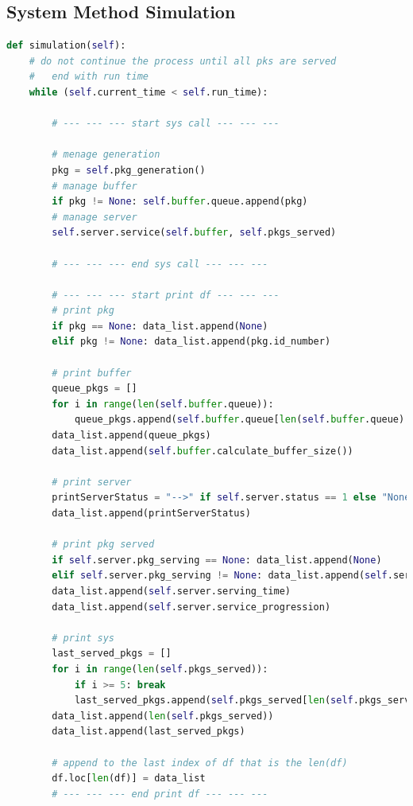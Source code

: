 \documentclass[12pt,a4paper]{article}
\begin{document}
\subsection{System Method Simulation}
\begin{lstlisting}[language=Python, caption=System Method Simulation]
def simulation(self): 
    # do not continue the process until all pks are served 
    # 	end with run time 
    while (self.current_time < self.run_time):

        # --- --- --- start sys call --- --- --- 

        # menage generation 
        pkg = self.pkg_generation()
        # manage buffer 
        if pkg != None: self.buffer.queue.append(pkg)
        # manage server
        self.server.service(self.buffer, self.pkgs_served)

        # --- --- --- end sys call --- --- ---
         
		# --- --- --- start print df --- --- ---
        # print pkg
        if pkg == None: data_list.append(None)
        elif pkg != None: data_list.append(pkg.id_number)

        # print buffer
        queue_pkgs = []
        for i in range(len(self.buffer.queue)):
            queue_pkgs.append(self.buffer.queue[len(self.buffer.queue) - i - 1].id_number)
        data_list.append(queue_pkgs)
        data_list.append(self.buffer.calculate_buffer_size())

        # print server 
        printServerStatus = "-->" if self.server.status == 1 else "None"
        data_list.append(printServerStatus)

        # print pkg served 
        if self.server.pkg_serving == None: data_list.append(None)
        elif self.server.pkg_serving != None: data_list.append(self.server.pkg_serving.id_number)
        data_list.append(self.server.serving_time)
        data_list.append(self.server.service_progression)
        
        # print sys
        last_served_pkgs = []
        for i in range(len(self.pkgs_served)):
            if i >= 5: break
            last_served_pkgs.append(self.pkgs_served[len(self.pkgs_served) - i - 1].id_number)
        data_list.append(len(self.pkgs_served))
        data_list.append(last_served_pkgs)

        # append to the last index of df that is the len(df)
        df.loc[len(df)] = data_list
        # --- --- --- end print df --- --- ---


\end{lstlisting}
\end{document}

